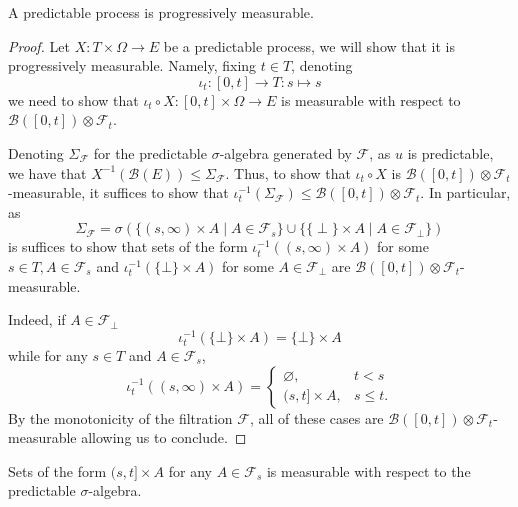 \begin{lemma}\label{lem:Predictable.progressive}
  \mathlibok
A predictable process is progressively measurable.
\end{lemma}

\begin{proof}Let $X : T \times \Omega \to E$ be a predictable process, we will show that it is progressively measurable. Namely, fixing $t \in T$, denoting
$$\iota_t : [0, t] \to T : s \mapsto s$$
we need to show that $\iota_t \circ X : [0, t] \times \Omega \to E$ is measurable with respect to $\mathcal{B}([0, t]) \otimes \mathcal{F}_t$.

Denoting $\Sigma_{\mathcal{F}}$ for the predictable $\sigma$-algebra generated by $\mathcal{F}$, as $u$ is predictable, we have that $X^{-1}(\mathcal{B}(E)) \le \Sigma_{\mathcal{F}}$. Thus, to show that $\iota_t \circ X$ is $\mathcal{B}([0, t]) \otimes \mathcal{F}_t$-measurable, it suffices to show that $\iota_t^{-1}(\Sigma_{\mathcal{F}}) \le \mathcal{B}([0, t]) \otimes \mathcal{F}_t$. In particular, as
$$\Sigma_{\mathcal{F}} = \sigma(\{(s, \infty) \times A \mid A \in \mathcal{F}_s\} \cup \{\{\perp\} \times A \mid A \in \mathcal{F}_\perp\})$$
is suffices to show that sets of the form $\iota_t^{-1}((s, \infty) \times A)$ for some $s \in T, A \in \mathcal{F}_s$ and $\iota_t^{-1}(\{\bot\} \times A)$ for some $A \in \mathcal{F}_\bot$ are $\mathcal{B}([0, t]) \otimes \mathcal{F}_t$-measurable.

Indeed, if $A \in \mathcal{F}_\bot$
$$\iota_t^{-1}(\{\bot\} \times A) = \{\bot\} \times A$$
while for any $s \in T$ and $A \in \mathcal{F}_s$,
$$\iota_t^{-1}((s, \infty) \times A) = \begin{cases}
    \varnothing, & t < s\\
    (s, t] \times A, & s \le t.
\end{cases}$$
By the monotonicity of the filtration $\mathcal{F}$, all of these cases are $\mathcal{B}([0, t]) \otimes \mathcal{F}_t$-measurable allowing us to conclude.
\end{proof}


\begin{lemma}\label{lem:predictable_Ioc_prod}
  \mathlibok
Sets of the form $(s, t] \times A$ for any $A \in \mathcal{F}_s$ is measurable with respect to the predictable $\sigma$-algebra.
\end{lemma}

